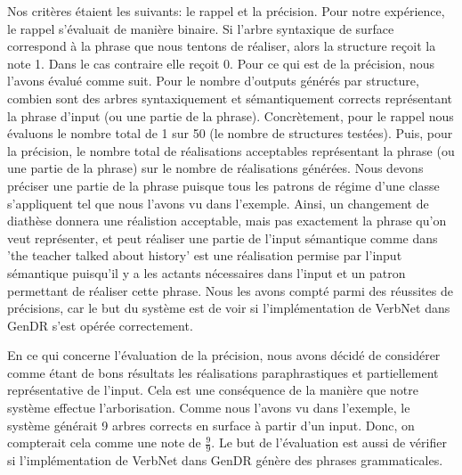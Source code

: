 Nos critères étaient les suivants: le rappel et la précision. Pour notre expérience, le rappel s'évaluait de manière binaire. Si l'arbre syntaxique de surface correspond à la phrase que nous tentons de réaliser, alors la structure reçoit la note 1. Dans le cas contraire elle reçoit 0. Pour ce qui est de la précision, nous l'avons évalué comme suit. Pour le nombre d'outputs générés par structure, combien sont des arbres syntaxiquement et sémantiquement corrects représentant la phrase d'input (ou une partie de la phrase). Concrètement, pour le rappel nous évaluons le nombre total de 1 sur 50 (le nombre de structures testées). Puis, pour la précision, le nombre total de réalisations acceptables représentant la phrase (ou une partie de la phrase) sur le nombre de réalisations générées. Nous devons préciser une partie de la phrase puisque tous les patrons de régime d'une classe s'appliquent tel que nous l'avons vu dans l'exemple. Ainsi, un changement de diathèse donnera une réalistion acceptable, mais pas exactement la phrase qu'on veut représenter, et peut réaliser une partie de l'input sémantique comme dans 'the teacher talked about history' est une réalisation permise par l'input sémantique puisqu'il y a les actants nécessaires dans l'input et un patron permettant de réaliser cette phrase. Nous les avons compté parmi des réussites de précisions, car le but du système est de voir si l'implémentation de VerbNet dans GenDR s'est opérée correctement.

En ce qui concerne l'évaluation de la précision, nous avons décidé de considérer comme étant de bons résultats les réalisations paraphrastiques et partiellement représentative de l'input. Cela est une conséquence de la manière que notre système effectue l'arborisation. Comme nous l'avons vu dans l'exemple, le système générait 9 arbres corrects en surface à partir d'un input. Donc, on compterait cela comme une note de \( \frac{9}{9} \). Le but de l'évaluation est aussi de vérifier si l'implémentation de VerbNet dans GenDR génère des phrases grammaticales.
                              
